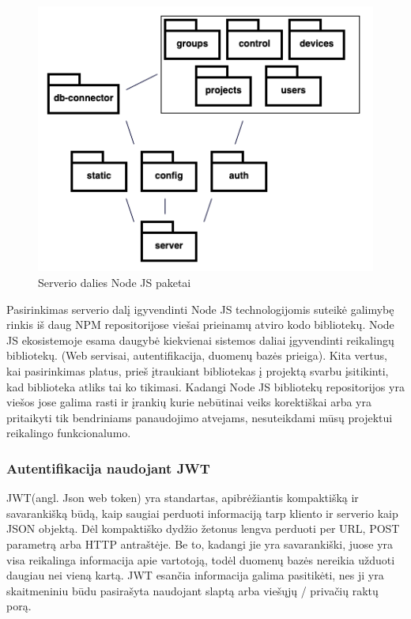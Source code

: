 \documentclass{VUMIFInfBakalaurinis}
\begin{document}
\begin{figure}[H]
    \centering
    \includegraphics[scale=0.7]{img/local-js-packages}
    \caption{Serverio dalies Node JS paketai}
    \label{img:mlp}
\end{figure}

Pasirinkimas serverio dalį igyvendinti Node JS technologijomis suteikė galimybę rinkis iš daug NPM repositorijose viešai prieinamų 
atviro kodo bibliotekų. Node JS ekosistemoje esama daugybė kiekvienai sistemos daliai įgyvendinti reikalingų bibliotekų.
(Web servisai, autentifikacija, duomenų bazės prieiga). Kita vertus, kai pasirinkimas platus, prieš įtraukiant bibliotekas į projektą svarbu
įsitikinti, kad biblioteka atliks tai ko tikimasi.
Kadangi Node JS bibliotekų repositorijos yra viešos jose galima rasti ir įrankių kurie nebūtinai veiks korektiškai arba yra pritaikyti tik
bendriniams panaudojimo atvejams, nesuteikdami mūsų projektui reikalingo funkcionalumo.

\subsubsection{Autentifikacija naudojant JWT}

JWT(angl. Json web token) yra standartas, apibrėžiantis kompaktišką ir savarankišką būdą, kaip saugiai perduoti informaciją tarp kliento ir serverio kaip JSON objektą.
Dėl kompaktiško dydžio žetonus lengva perduoti per URL, POST parametrą arba HTTP antraštėje.
Be to, kadangi jie yra savarankiški, juose yra visa reikalinga informacija apie vartotoją, todėl duomenų bazės nereikia užduoti daugiau nei vieną kartą.
JWT esančia informacija galima pasitikėti, nes ji yra skaitmeniniu būdu pasirašyta naudojant slaptą arba viešųjų / privačių raktų porą. \cite{JWT}
\end{document}
